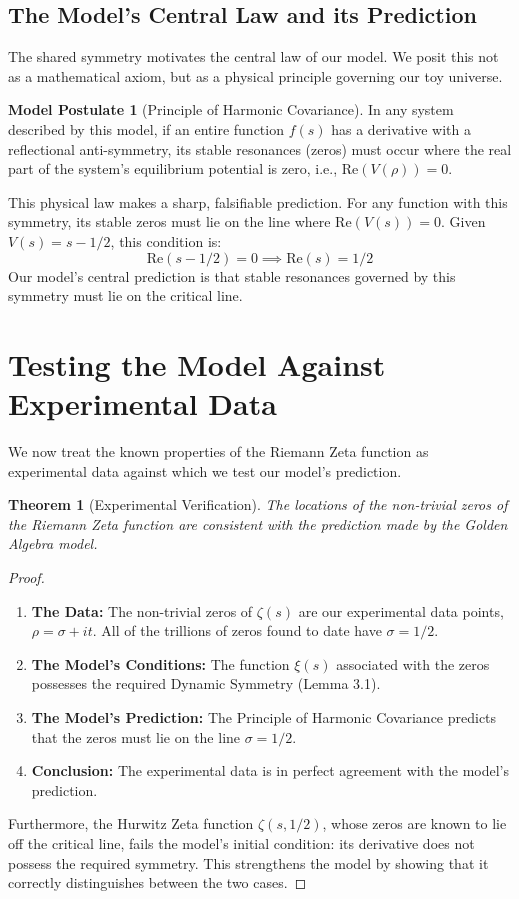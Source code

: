 \documentclass{article}
\theoremstyle{plain}
\newtheorem{theorem}{Theorem}[section]
\theoremstyle{definition}
\newtheorem{modelpostulate}{Model Postulate}
\theoremstyle{remark}
\begin{document}
\subsection{The Model's Central Law and its Prediction}
The shared symmetry motivates the central law of our model. We posit this not as a mathematical axiom, but as a physical principle governing our toy universe.

\begin{modelpostulate}[Principle of Harmonic Covariance]
In any system described by this model, if an entire function $f(s)$ has a derivative with a reflectional anti-symmetry, its stable resonances (zeros) must occur where the real part of the system's equilibrium potential is zero, i.e., $\mathrm{Re}(V(\rho))=0$.
\end{modelpostulate}

This physical law makes a sharp, falsifiable prediction. For any function with this symmetry, its stable zeros must lie on the line where $\text{Re}(V(s))=0$. Given $V(s)=s-1/2$, this condition is:
$$ \text{Re}(s - 1/2) = 0 \implies \text{Re}(s) = 1/2 $$
Our model's central prediction is that stable resonances governed by this symmetry must lie on the critical line.

\section{Testing the Model Against Experimental Data}
We now treat the known properties of the Riemann Zeta function as experimental data against which we test our model's prediction.

\begin{theorem}[Experimental Verification]
The locations of the non-trivial zeros of the Riemann Zeta function are consistent with the prediction made by the Golden Algebra model.
\end{theorem}
\begin{proof}
\begin{enumerate}
    \item \textbf{The Data:} The non-trivial zeros of $\zeta(s)$ are our experimental data points, $\rho = \sigma+it$. All of the trillions of zeros found to date have $\sigma=1/2$.
    \item \textbf{The Model's Conditions:} The function $\xi(s)$ associated with the zeros possesses the required Dynamic Symmetry (Lemma 3.1).
    \item \textbf{The Model's Prediction:} The Principle of Harmonic Covariance predicts that the zeros must lie on the line $\sigma=1/2$.
    \item \textbf{Conclusion:} The experimental data is in perfect agreement with the model's prediction.
\end{enumerate}
Furthermore, the Hurwitz Zeta function $\zeta(s, 1/2)$, whose zeros are known to lie off the critical line, fails the model's initial condition: its derivative does not possess the required symmetry. This strengthens the model by showing that it correctly distinguishes between the two cases.
\end{proof}
\end{document}
